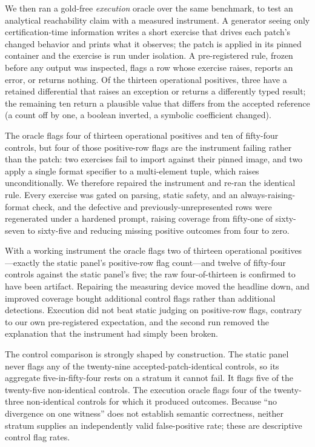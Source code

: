 \documentclass[11pt]{article}
\begin{document}
We then ran a gold-free \emph{execution} oracle over the same benchmark, to test an analytical reachability
claim with a measured instrument. A generator seeing only certification-time information writes a short exercise that drives each
patch's changed behavior and prints what it observes; the patch is applied in its pinned container and the
exercise is run under isolation. A pre-registered rule, frozen before any output was inspected, flags a row
whose exercise raises, reports an error, or returns nothing. Of the thirteen operational positives, three have
a retained differential that raises an exception or returns a differently typed result; the remaining ten
return a plausible value that differs from the accepted reference (a count off by one, a boolean inverted, a
symbolic coefficient changed).

The oracle flags four of thirteen operational positives and ten of fifty-four controls, but four of those
positive-row flags are
the instrument failing rather than the patch: two exercises fail to import against their pinned image, and two
apply a single format specifier to a multi-element tuple, which raises unconditionally. We therefore repaired
the instrument and re-ran the identical rule. Every exercise was gated on parsing, static safety, and an
always-raising-format check, and the defective and previously-unrepresented rows were regenerated under a
hardened prompt, raising coverage from fifty-one of sixty-seven to sixty-five and reducing missing positive
outcomes from four to zero.

With a working instrument the oracle flags two of thirteen operational positives---exactly the static panel's
positive-row flag count---and twelve of fifty-four controls against the static panel's five; the raw
four-of-thirteen is confirmed to have been artifact.
Repairing the measuring device moved the headline down, and improved coverage bought additional control flags
rather than additional detections. Execution did not beat static judging on positive-row flags, contrary to our own
pre-registered expectation, and the second run removed the explanation that the instrument had simply been
broken.

The control comparison is strongly shaped by construction. The static panel never flags any of the
twenty-nine accepted-patch-identical controls, so its aggregate five-in-fifty-four rests on a stratum it cannot
fail. It flags five of the twenty-five non-identical controls. The execution oracle flags four of the
twenty-three non-identical controls for which it produced outcomes. Because ``no divergence on one witness''
does not establish semantic correctness, neither stratum supplies an independently valid false-positive rate;
these are descriptive control flag rates.
\end{document}
